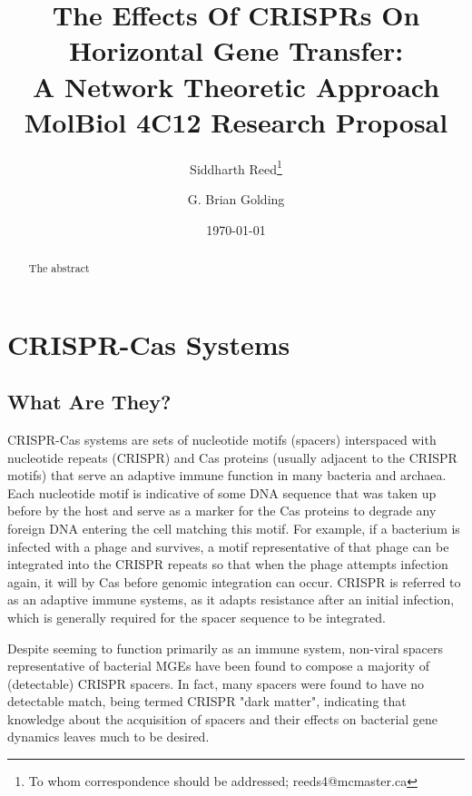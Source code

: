 \documentclass[12pt,letter]{article}
\begin{document}
\title{The Effects Of CRISPRs On Horizontal Gene Transfer:\\
        A Network Theoretic Approach\\ \vspace{0.5cm}
       \Large MolBiol 4C12 Research Proposal}
\author[1]{Siddharth Reed\thanks{To whom correspondence should be addressed; reeds4@mcmaster.ca}}
\author[1]{G. Brian Golding}
\date{\today}
\maketitle
\begin{abstract}
    The abstract
\end{abstract}
\newpage
\linespread{1.25}%
\section{CRISPR-Cas Systems}
\subsection{What Are They?}
CRISPR-Cas systems are sets of nucleotide motifs (spacers) interspaced with nucleotide repeats (CRISPR) and Cas proteins (usually adjacent to the CRISPR motifs) that serve an adaptive immune function in many bacteria and archaea\citep{crispgen}.
Each nucleotide motif is indicative of some DNA sequence that was taken up before by the host and serve as a marker for the Cas proteins to degrade any foreign  DNA entering the cell matching this motif.
For example, if a bacterium is infected with a phage and survives, a motif representative of that phage can be integrated into the CRISPR repeats so that when the phage attempts infection again, it will by Cas before genomic integration can occur.
CRISPR is referred to as an adaptive immune systems, as it adapts resistance after an initial infection, which is generally required for the spacer sequence to be integrated.\par
Despite seeming to function primarily as an immune system, non-viral spacers representative of bacterial MGEs have been found to compose a majority of (detectable) CRISPR spacers\citep{nonvspacer}.
In fact, many spacers were found to have no detectable match, being termed CRISPR "dark matter", indicating that knowledge about the acquisition of spacers and their effects on bacterial gene dynamics leaves much to be desired\citep{nonvspacer}.
\end{document}
